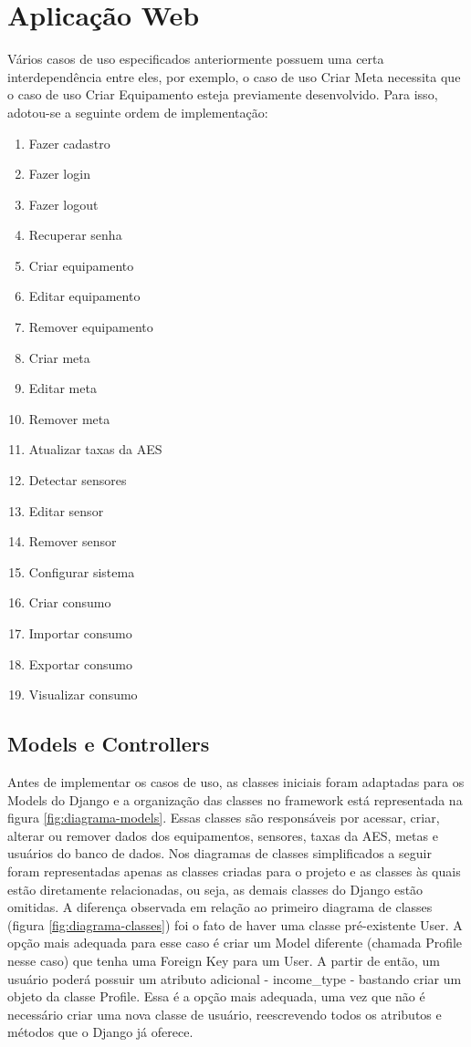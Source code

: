 \section{Aplicação Web}
\label{Sec:5-aplicativo-web}

Vários casos de uso especificados anteriormente possuem uma certa interdependência entre eles, por exemplo, o caso de uso Criar Meta necessita que o caso de uso Criar Equipamento esteja previamente desenvolvido. Para isso, adotou-se a seguinte ordem de implementação:

\begin{enumerate}
	\item{Fazer cadastro}
	\item{Fazer login}
	\item{Fazer logout}
	\item{Recuperar senha}
	\item{Criar equipamento}
	\item{Editar equipamento}
	\item{Remover equipamento}
	\item{Criar meta}
	\item{Editar meta}
	\item{Remover meta}
	\item{Atualizar taxas da AES}
	\item{Detectar sensores}
	\item{Editar sensor}
	\item{Remover sensor}
	\item{Configurar sistema}
	\item{Criar consumo}
	\item{Importar consumo}
	\item{Exportar consumo}
	\item{Visualizar consumo}
\end{enumerate}

\subsection{Models e Controllers}

Antes de implementar os casos de uso, as classes iniciais foram adaptadas para os Models do Django e a organização das classes no framework está representada na figura \ref{fig:diagrama-models}. Essas classes são responsáveis por acessar, criar, alterar ou remover dados dos equipamentos, sensores, taxas da AES, metas e usuários do banco de dados. Nos diagramas de classes simplificados a seguir foram representadas apenas as classes criadas para o projeto e as classes às quais estão diretamente relacionadas, ou seja, as demais classes do Django estão omitidas. A diferença observada em relação ao primeiro diagrama de classes (figura \ref{fig:diagrama-classes}) foi o fato de haver uma classe pré-existente User. A opção mais adequada para esse caso é criar um Model diferente (chamada Profile nesse caso) que tenha uma Foreign Key para um User. A partir de então, um usuário poderá possuir um atributo adicional - income\_type - bastando criar um objeto da classe Profile. Essa é a opção mais adequada, uma vez que não é necessário criar uma nova classe de usuário, reescrevendo todos os atributos e métodos que o Django já oferece.

